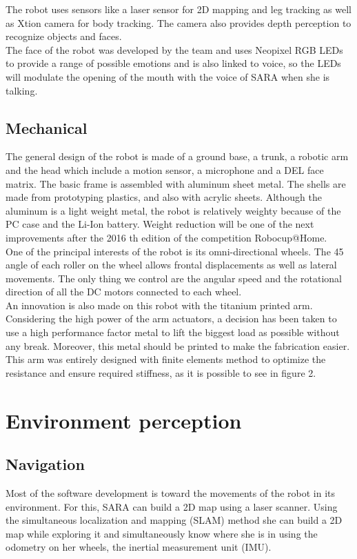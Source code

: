 \documentclass[runningheads,a4paper]{llncs}
\begin{document}
The robot uses sensors like a laser sensor for 2D mapping and leg tracking as well as Xtion camera for body tracking. The camera also provides depth perception to recognize objects and faces. \\

The face of the robot was developed by the team and uses Neopixel RGB LEDs to provide a range of possible emotions and is also linked to voice, so the LEDs will modulate the opening of the mouth with the voice of SARA when she is talking. 

\subsection{Mechanical}
\tab The general design of the robot is made of a ground base, a trunk, a robotic arm and the head which include a motion sensor, a microphone and a DEL face matrix. The basic frame is assembled with aluminum sheet metal. The shells are made from prototyping plastics, and also with acrylic sheets. Although the aluminum is a light weight metal, the robot is relatively weighty because of the PC case and the Li-Ion battery. Weight reduction will be one of the next improvements after the 2016 th edition of the competition Robocup@Home. \\

One of the principal interests of the robot is its omni-directional wheels. The 45 angle of each roller on the wheel allows frontal displacements as well as lateral movements. The only thing we control are the angular speed and the rotational direction of all the DC motors connected to each wheel. \\

An innovation is also made on this robot with the titanium printed arm. Considering the high power of the arm actuators, a decision has been taken to use a high performance factor metal to lift the biggest load as possible without any break. Moreover, this metal should be printed to make the fabrication easier. This arm was entirely designed with finite elements method to optimize the resistance and ensure required stiffness, as it is possible to see in figure 2. 

\section{Environment perception}
\subsection{Navigation}
\tab Most of the software development is toward the movements of the robot in its environment. For this, SARA can build a 2D map using a laser scanner. Using the simultaneous localization and mapping (SLAM) method she can build a 2D map while exploring it and simultaneously know where she is in using the odometry on her wheels, the inertial measurement unit (IMU). \\
\end{document}
